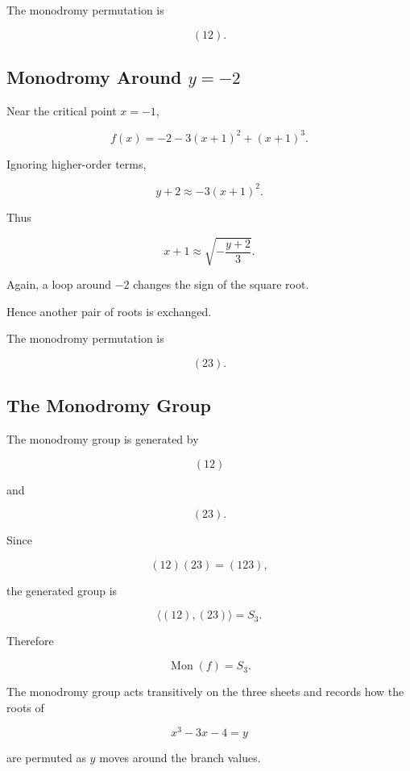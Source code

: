 \documentclass[12pt,a4paper]{article}
\theoremstyle{notespace}
\begin{document}
The monodromy permutation is

\[
(12).
\]

\subsection{Monodromy Around \texorpdfstring{$y=-2$}{y=-2}}

Near the critical point \(x=-1\),

\[
f(x)
=
-2
-
3(x+1)^2
+
(x+1)^3.
\]

Ignoring higher-order terms,

\[
y+2
\approx
-3(x+1)^2.
\]

Thus

\[
x+1
\approx
\sqrt{-\frac{y+2}{3}}.
\]

Again, a loop around \(-2\) changes the sign of the square root.

Hence another pair of roots is exchanged.

The monodromy permutation is

\[
(23).
\]

\subsection{The Monodromy Group}

The monodromy group is generated by

\[
(12)
\]

and

\[
(23).
\]

Since

\[
(12)(23)
=
(123),
\]

the generated group is

\[
\langle (12),(23)\rangle
=
S_3.
\]

Therefore

\[
\boxed{
	\operatorname{Mon}(f)=S_3.
}
\]

The monodromy group acts transitively on the three sheets and records
how the roots of

\[
x^3-3x-4=y
\]

are permuted as \(y\) moves around the branch values.
\end{document}
